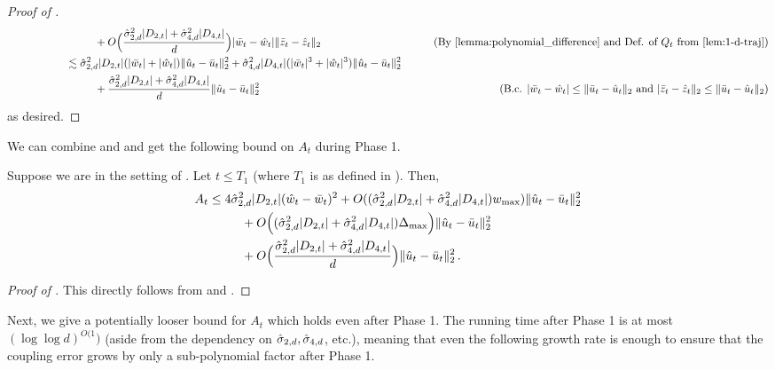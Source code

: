 \begin{proof}[Proof of ]
\begin{align}
    & \nextlinespace\nextlinespace\nextlinespace + O\Big(\frac{\sigmaCoeffTwo^2 |D_{2, t}| + \sigmaCoeffFour^2 |D_{4, t}|}{d}\Big) |\wbar_t - \what_t| \|\zbar_t - \zhat_t\|_2
    & \tag{By \Cref{lemma:polynomial_difference} and Def. of $Q_t$ from \Cref{lem:1-d-traj}} \\
    & \nextlinespace\nextlinespace \lesssim \sigmaCoeffTwo^2 |D_{2, t}| (|\wbar_t| + |\what_t|) \|\uhat_t - \ubar_t\|_2^2 + \sigmaCoeffFour^2 |D_{4, t}| (|\wbar_t|^3 + |\what_t|^3) \|\uhat_t - \ubar_t\|_2^2 \\
    & \nextlinespace\nextlinespace\nextlinespace + \frac{\sigmaCoeffTwo^2 |D_{2, t}| + \sigmaCoeffFour^2 |D_{4, t}|}{d} \|\uhat_t - \ubar_t \|_2^2
    & \tag{B.c. $|\wbar_t - \what_t| \leq \|\ubar_t - \uhat_t\|_2$ and $|\zbar_t - \zhat_t\|_2 \leq \|\ubar_t - \uhat_t\|_2$}
    \end{align}
as desired.
\end{proof}

We can combine  and  and get the following bound on $A_t$ during Phase 1.

\begin{lemma}\label{lemma:At_bound_first}
Suppose we are in the setting of . Let $t \leq T_1$ (where $T_1$ is as defined in ). Then,
\begin{align}
A_t 
& \leq 4 \hat{\sigma}_{2, d}^2 |D_{2,t}| (\hat{w}_t - \bar{w}_t)^2 + O((\hat{\sigma}_{2, d}^2 |D_{2, t}| + \hat{\sigma}_{4, d}^2 |D_{4,t}|) {w_{\textup{max}}}) \|\hat{u}_t - \bar{u}_t\|_2^2 \\
& \,\,\,\,\,\,\,\,\,\,\,\,\,\,\,\, + O\Big((\hat{\sigma}_{2, d}^2 |D_{2, t}| + \hat{\sigma}_{4, d}^2 |D_{4,t}|) \Delta_{\textup{max}} \Big) \|\hat{u}_t - \bar{u}_t\|_2^2 \\
& \,\,\,\,\,\,\,\,\,\,\,\,\,\,\,\, + O\Big(\frac{\hat{\sigma}_{2, d}^2 |D_{2, t}| + \hat{\sigma}_{4, d}^2 |D_{4, t}|}{d} \Big) \|\hat{u}_t - \bar{u}_t\|_2^2 \,.
\end{align}
\end{lemma}
\begin{proof}[Proof of ]
This directly follows from  and .
\end{proof}

Next, we give a potentially looser bound for $A_t$ which holds even after Phase 1. The running time after Phase 1 is at most $(\log \log d)^{O(1})$ (aside from the dependency on $\hat{\sigma}_{2, d}, \hat{\sigma}_{4, d}$, etc.), meaning that even the following growth rate is enough to ensure that the coupling error grows by only a sub-polynomial factor after Phase 1.

